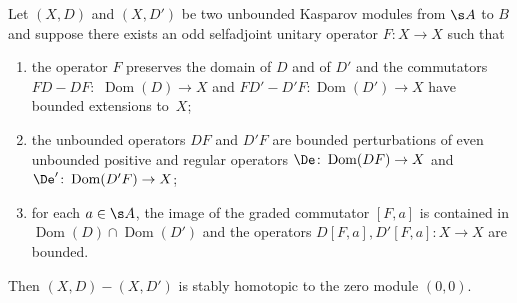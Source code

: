 \begin{prop}\label{p:phaequ}
Let $(X,D)$ and $(X,D')$ be two unbounded Kasparov modules from $\s A$ to $B$ and suppose there exists an odd selfadjoint unitary operator $F\colon X \to X$ such that
\begin{enumerate}\itemsep=0pt
\item[$1)$] the operator $F$ preserves the domain of $D$ and of $D'$ and the commutators $F D - D F\colon$ $\operatorname{Dom}(D) \to X$ and $F D' - D' F\colon \operatorname{Dom}(D') \to X$ have bounded extensions to~$X$;
\item[$2)$] the unbounded operators $D F$ and $D' F$ are bounded perturbations of even unbounded positive and regular operators $\De\colon \operatorname{Dom}(DF) \to X$ and $\De'\colon \operatorname{Dom}(D'F) \to X$;
\item[$3)$] for each $a \in \s A$, the image of the graded commutator $[F,a]$ is contained in $\operatorname{Dom}(D) \cap \operatorname{Dom}(D')$ and the operators $D [F,a], D' [F,a]\colon X \to X$ are bounded.
\end{enumerate}
Then $(X,D) - (X,D')$ is stably homotopic to the zero module $(0,0)$.
\end{prop}

